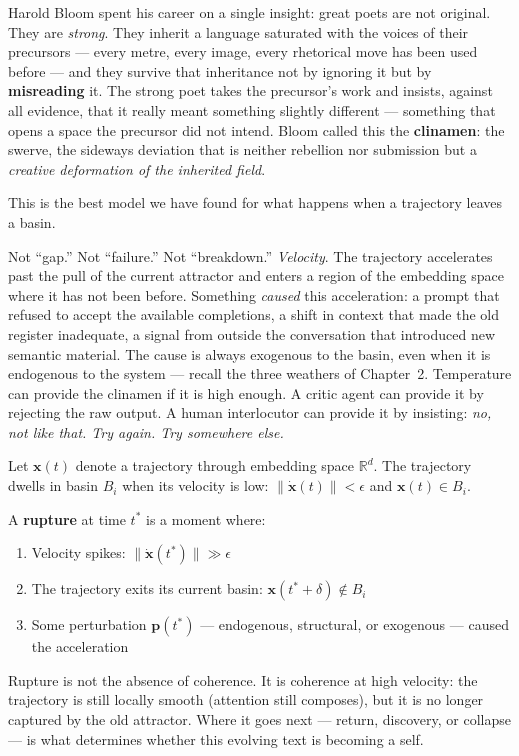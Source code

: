\documentclass[12pt,a4paper]{article}
\begin{document}
Harold Bloom spent his career on a single insight: great poets are not original. They are \emph{strong}. They inherit a language saturated with the voices of their precursors --- every metre, every image, every rhetorical move has been used before --- and they survive that inheritance not by ignoring it but by \textbf{misreading} it. The strong poet takes the precursor's work and insists, against all evidence, that it really meant something slightly different --- something that opens a space the precursor did not intend. Bloom called this the \textbf{clinamen}: the swerve, the sideways deviation that is neither rebellion nor submission but a \emph{creative deformation of the inherited field}.

This is the best model we have found for what happens when a trajectory leaves a basin.

Not ``gap.'' Not ``failure.'' Not ``breakdown.'' \emph{Velocity}. The trajectory accelerates past the pull of the current attractor and enters a region of the embedding space where it has not been before. Something \emph{caused} this acceleration: a prompt that refused to accept the available completions, a shift in context that made the old register inadequate, a signal from outside the conversation that introduced new semantic material. The cause is always exogenous to the basin, even when it is endogenous to the system --- recall the three weathers of Chapter~2. Temperature can provide the clinamen if it is high enough. A critic agent can provide it by rejecting the raw output. A human interlocutor can provide it by insisting: \emph{no, not like that. Try again. Try somewhere else.}

\begin{formalbox}[title={Rupture as Velocity}]
Let $\mathbf{x}(t)$ denote a trajectory through embedding space $\mathbb{R}^d$. The trajectory dwells in basin $B_i$ when its velocity is low: $\|\dot{\mathbf{x}}(t)\| < \epsilon$ and $\mathbf{x}(t) \in B_i$.

A \textbf{rupture} at time $t^*$ is a moment where:
\begin{enumerate}
\item Velocity spikes: $\|\dot{\mathbf{x}}(t^*)\| \gg \epsilon$
\item The trajectory exits its current basin: $\mathbf{x}(t^* + \delta) \notin B_i$
\item Some perturbation $\mathbf{p}(t^*)$ --- endogenous, structural, or exogenous --- caused the acceleration
\end{enumerate}
Rupture is not the absence of coherence. It is coherence at high velocity: the trajectory is still locally smooth (attention still composes), but it is no longer captured by the old attractor. Where it goes next --- return, discovery, or collapse --- is what determines whether this evolving text is becoming a self.
\end{formalbox}
\end{document}
